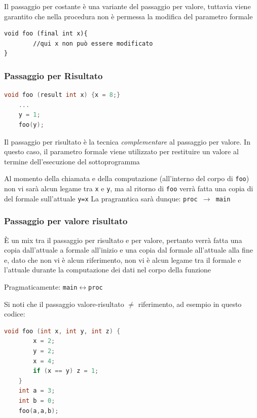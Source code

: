 Il passaggio per costante è una variante del passaggio per valore, tuttavia viene garantito che nella procedura non è permessa la modifica del parametro formale


\begin{lstlisting}[style=javastyle]
void foo (final int x){ 
        //qui x non può essere modificato
}
\end{lstlisting}

\subsubsection{Passaggio per Risultato}

\begin{lstlisting}[language=C]
    void foo (result int x) {x = 8;}
    ...
    y = 1;
    foo(y);
\end{lstlisting}

Il passaggio per risultato è la tecnica \textit{complementare} al passaggio per valore. In questo caso, il parametro formale viene utilizzato per restituire un valore al termine dell'esecuzione del sottoprogramma

Al momento della chiamata e della computazione (all'interno del corpo di \texttt{foo}) non vi sarà alcun legame tra \texttt{x} e \texttt{y}, ma al ritorno di \texttt{foo} verrà fatta una copia di del formale sull'attuale \texttt{y=x}
La pragramtica sarà dunque: \texttt{proc $\to$ main}

\subsubsection{Passaggio per valore risultato}
È un mix tra il passaggio per risultato e per valore, pertanto verrà fatta una copia dall'attuale a formale all'inizio e una copia dal formale all'attuale alla fine e, dato che non vi è alcun riferimento, non vi è alcun legame tra il formale e l'attuale durante la computazione dei dati nel corpo della funzione

Pragmaticamente: \texttt{main$\leftrightarrow$proc}


Si noti che il passaggio valore-risultato $\neq$ riferimento, ad esempio in questo codice:

\begin{lstlisting}[language=C]
    void foo (int x, int y, int z) {
        x = 2;
        y = 2;
        x = 4;
        if (x == y) z = 1;
    }
    int a = 3;
    int b = 0;
    foo(a,a,b);
\end{lstlisting}

